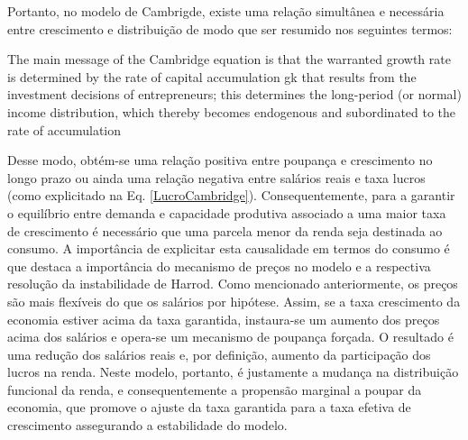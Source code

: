 Portanto, no modelo de Cambrigde, existe uma relação simultânea e necessária entre crescimento e distribuição de modo que ser resumido nos seguintes termos:

\begin{citacao}
The main message of the Cambridge
equation is that the warranted growth rate is determined by the rate of capital
accumulation gk that results from the investment decisions of entrepreneurs; this
determines the long-period (or normal) income distribution, which thereby
becomes endogenous and subordinated to the rate of accumulation \cite[p.~158]{cesaratto_neo-kaleckian_2015}
\end{citacao}
Desse modo, obtém-se uma relação positiva entre poupança e crescimento no longo prazo ou ainda uma relação negativa entre salários reais e taxa lucros (como explicitado na Eq. \ref{LucroCambridge}). Consequentemente, para a garantir o equilíbrio entre demanda e capacidade produtiva associado a uma maior taxa de crescimento é necessário que uma parcela menor da renda seja destinada ao consumo. A importância de explicitar esta causalidade em termos do consumo é que destaca a importância do mecanismo de preços no modelo e a respectiva resolução da instabilidade de Harrod. Como mencionado anteriormente, os preços são mais flexíveis do que os salários por hipótese. Assim, se a taxa crescimento da economia estiver acima da taxa garantida, instaura-se um aumento dos preços acima dos salários e opera-se um mecanismo de poupança forçada. O resultado é uma redução dos salários reais e, por definição, aumento da participação dos lucros na renda.  Neste modelo, portanto, é justamente a mudança na distribuição funcional da renda, e consequentemente a propensão marginal a poupar da economia, que promove o ajuste da taxa garantida para a taxa efetiva de crescimento assegurando a estabilidade do modelo.

